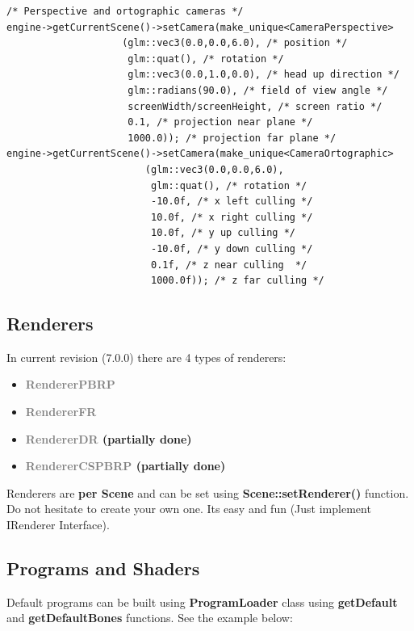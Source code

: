 \documentclass{article}
\begin{document}
\begin{lstlisting}
/* Perspective and ortographic cameras */
engine->getCurrentScene()->setCamera(make_unique<CameraPerspective>
                    (glm::vec3(0.0,0.0,6.0), /* position */
                     glm::quat(), /* rotation */                
                     glm::vec3(0.0,1.0,0.0), /* head up direction */         
                     glm::radians(90.0), /* field of view angle */        
                     screenWidth/screenHeight, /* screen ratio */
                     0.1, /* projection near plane */
                     1000.0)); /* projection far plane */
engine->getCurrentScene()->setCamera(make_unique<CameraOrtographic>
                        (glm::vec3(0.0,0.0,6.0),
                         glm::quat(), /* rotation */                
                         -10.0f, /* x left culling */
                         10.0f, /* x right culling */
                         10.0f, /* y up culling */
                         -10.0f, /* y down culling */
                         0.1f, /* z near culling  */
                         1000.0f)); /* z far culling */
\end{lstlisting}

\subsection{Renderers}\label{sec:Renderers}

\indent \indent In current revision (7.0.0) there are 4 types of renderers:

\begin{itemize}
\item \textbf{\textcolor{gray}{RendererPBRP}}
\item \textbf{\textcolor{gray}{RendererFR}}
\item \textbf{\textcolor{gray}{RendererDR} (partially done)}
\item \textbf{\textcolor{gray}{RendererCSPBRP} (partially done)}
\end{itemize}

\indent \indent Renderers are \textbf{per Scene} and can be set using \textbf{Scene::setRenderer()} function. Do not hesitate to create your own one. Its easy and fun (Just implement IRenderer Interface).

\subsection{Programs and Shaders}\label{sec:Programs and Shaders}
\indent \indent Default programs can be built using \textbf{ProgramLoader} class using \textbf{getDefault} and \textbf{getDefaultBones} functions. See the example below:
\end{document}

